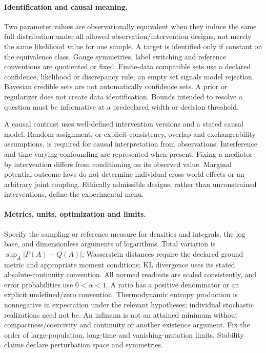 \documentclass[11pt]{article}
\begin{document}
\paragraph{Identification and causal meaning.}
Two parameter values are observationally equivalent when they induce the same full distribution under all allowed observation/intervention designs, not merely the same likelihood value for one sample. A target is identified only if constant on the equivalence class. Gauge symmetries, label switching and reference conventions are quotiented or fixed. Finite-data compatible sets use a declared confidence, likelihood or discrepancy rule; an empty set signals model rejection. Bayesian credible sets are not automatically confidence sets. A prior or regularizer does not create data identification. Bounds intended to resolve a question must be informative at a predeclared width or decision threshold.

A causal contrast uses well-defined intervention versions and a stated causal model. Random assignment, or explicit consistency, overlap and exchangeability assumptions, is required for causal interpretation from observations. Interference and time-varying confounding are represented when present. Fixing a mediator by intervention differs from conditioning on its observed value. Marginal potential-outcome laws do not determine individual cross-world effects or an arbitrary joint coupling. Ethically admissible designs, rather than unconstrained interventions, define the experimental menu.

\paragraph{Metrics, units, optimization and limits.}
Specify the sampling or reference measure for densities and integrals, the log base, and dimensionless arguments of logarithms. Total variation is $\sup_A|P(A)-Q(A)|$; Wasserstein distances require the declared ground metric and appropriate moment conditions; KL divergence uses its stated absolute-continuity convention. All normed readouts are scaled consistently, and error probabilities use $0<\alpha<1$. A ratio has a positive denominator or an explicit undefined/zero convention. Thermodynamic entropy production is nonnegative in expectation under the relevant hypotheses; individual stochastic realizations need not be. An infimum is not an attained minimum without compactness/coercivity and continuity or another existence argument. Fix the order of large-population, long-time and vanishing-mutation limits. Stability claims declare perturbation space and symmetries.
\end{document}
